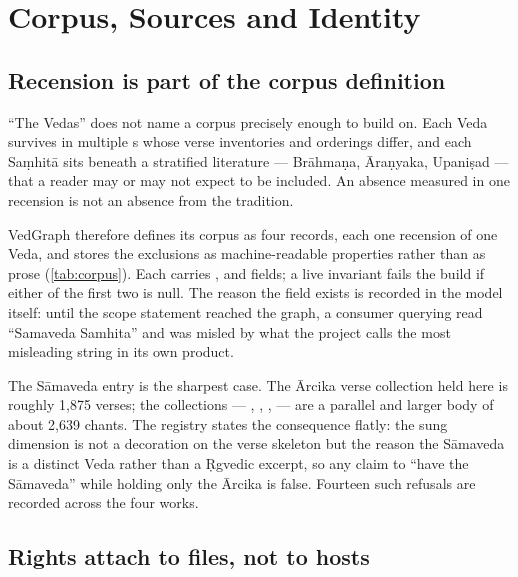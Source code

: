 \section{Corpus, Sources and Identity}
\label{sec:corpus}

\subsection{Recension is part of the corpus definition}
\label{sec:scope}

``The Vedas'' does not name a corpus precisely enough to build on. Each Veda survives
in multiple s whose verse inventories and orderings differ, and each
Sa\d{m}hit\=a sits beneath a stratified literature --- Br\=ahma\d{n}a,
\=Ara\d{n}yaka, Upani\d{s}ad --- that a reader may or may not expect to be included.
An absence measured in one recension is not an absence from the tradition.

VedGraph therefore defines its corpus as four  records, each one recension
of one Veda, and stores the exclusions as machine-readable properties rather than as
prose (\cref{tab:corpus}). Each  carries ,
 and  fields; a live invariant fails the
build if either of the first two is null. The reason the field exists is recorded in
the model itself: until the scope statement reached the graph, a consumer querying
 read ``Samaveda Samhita'' and was misled by what the project calls
the most misleading string in its own product.



The S\=amaveda entry is the sharpest case. The \=Arcika verse collection held here is
roughly 1{,}875 verses; the  collections --- ,
, ,  --- are a parallel
and larger body of about 2{,}639 chants. The registry states the consequence flatly:
the sung dimension is not a decoration on the verse skeleton but the reason the
S\=amaveda is a distinct Veda rather than a \d{R}gvedic excerpt, so any claim to
``have the S\=amaveda'' while holding only the \=Arcika is false. Fourteen such
refusals are recorded across the four works.

\subsection{Rights attach to files, not to hosts}

